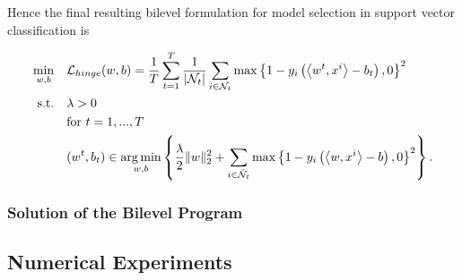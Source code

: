 
Hence the final resulting bilevel formulation for model selection in support vector classification is 

%

\begin{align}
\begin{split}
	\min_{w,b} \quad &  \mathcal{L}_{hinge}(w,b) = \frac{1}{T}\sum_{t=1}^T\frac{1}{|\mathcal{N}_t|}\sum_{i \in \mathcal{N}_t}{\max\left\{1-y_i\left(\left\langle w^t,x^i\right\rangle-b_t\right),0\right\}^2}\\
	\text{s.t.} \quad & \lambda > 0 \\
	& \text{for } t = 1,...,T \\
	& (w^t,b_t) \in \operatorname*{arg\,min}_{w,b}\left\{ \frac{\lambda}{2} \|w\|^2_2+\sum_{i\in \bar{\mathcal{N}}_t}\max\left\{1-y_i\left(\left\langle w,x^i\right\rangle-b\right),0\right\}^2\right\}. \\
\end{split}
\label{model_2}
\end{align}


\subsubsection{Solution of the Bilevel Program}



\subsection{Numerical Experiments}

